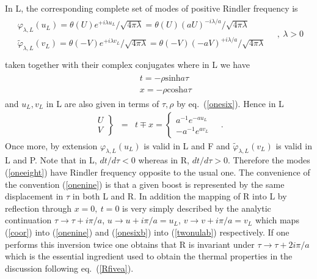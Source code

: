 \documentclass[12pt,oneside]{report}
\def\la{\lambda}
\begin{document}
In L, the corresponding complete set of modes of positive Rindler frequency is
\begin{eqnarray}
\begin{array}{c}
\varphi_{\la,L}(u_L) = \theta(U) {e^{+i \la u_L} / \sqrt{4 \pi \la}}
 =\theta(U) {(aU)^{-i \la /a}   /\sqrt{4 \pi \la}} \\
\tilde \varphi_{\la,L} (v_L)= \theta(-V){e^{+i \la v_L} / \sqrt{4 \pi \la}}
=\theta(-V) {(-aV)^{+i \la /a }/\sqrt{4 \pi \la}}
\end{array}
\quad ,\ \la > 0\nonumber\\
\label{oneeight}
\end{eqnarray}
taken together with their complex conjugates where in L we have
\begin{eqnarray}
&&\begin{array}{r}
t=-\rho \mbox{sinh} a \tau \\
x=-\rho \mbox{cosh} a \tau
\end{array}
  \label{onenine}\end{eqnarray}
and $u_L,v_L$ in L are also given in terms of $\tau, \rho$ by eq.~(\ref{onesix}).
Hence in L 
\begin{eqnarray}
\left.
\begin{array}{r}
U\\V
\end{array}
\right\} &=& t \mp x = \left\{  
\begin{array}{l}
a^{-1}e^{-au_L}\\ -a^{-1}e^{av_L}
\end{array}\right. \quad .
\label{twonulab}
\end{eqnarray}
 Once more, by extension
$\varphi_{\la,L}(u_L)$ is valid in L and F and
$\tilde \varphi_{\la,L}(v_L)$  is valid in L and
P. Note that in L, $dt/d\tau <0$ whereas in R, $dt/d\tau
>0$. Therefore the modes (\ref{oneeight}) have Rindler frequency opposite
to the usual one.  The convenience of the convention (\ref{onenine}) is that a
given boost is represented by the same displacement in $\tau$ in both L and
R. 
In addition the mapping of R into L by reflection through $x=0,\ t=0$ is
very simply described by the analytic continuation $\tau \to \tau + i \pi /
a$,  $u \to u + i \pi / a=u_L$, $v \to v + i \pi / a=v_L$ which maps (\ref{coor})
into (\ref{onenine}) and (\ref{onesixb}) into (\ref{twonulab}) respectively. If
one performs this inversion twice one obtains that R is invariant under 
$\tau \to \tau + 2i \pi / a$ which is the essential ingredient used to obtain
the thermal properties in the discussion following eq.~(\ref{Rfivea}).
\end{document}
